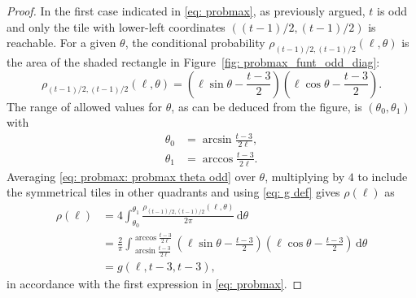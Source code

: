 \documentclass[12pt, a4paper]{article}
\newcommand{\diff}{\,\mathrm d}
\newcommand{\probmax}{\rho} %
\newcommand{\len}{\ell} %
\newcommand{\tiles}{t} %
\begin{document}
\begin{proof}
In the first case indicated in \eqref{eq: probmax}, as previously argued, $\tiles$ is odd and only the tile with lower-left coordinates $((\tiles-1)/2, (\tiles-1)/2)$ is reachable. For a given $\theta$, the conditional probability $\probmax_{(\tiles-1)/2, (\tiles-1)/2}(\len, \theta)$ is the area of the shaded rectangle in Figure~\ref{fig: probmax_funt_odd_diag}:
\begin{equation}
\label{eq: probmax: probmax theta odd}
\probmax_{(\tiles-1)/2, (\tiles-1)/2}(\len, \theta) = \left(\len\sin\theta - \frac{\tiles-3}2\right) \left(\len\cos\theta - \frac{\tiles-3}2\right).
\end{equation}
The range of allowed values for $\theta$, as can be deduced from the figure, is $(\theta_0, \theta_1)$ with
\begin{align}
\label{eq: odd theta 0}
\theta_0 & = \arcsin\frac{\tiles-3}{2\len}, \\
\label{eq: odd theta 1}
\theta_1 & = \arccos\frac{\tiles-3}{2\len}.
\end{align}
Averaging \eqref{eq: probmax: probmax theta odd} over $\theta$, multiplying by $4$ to include the symmetrical tiles in other quadrants and using \eqref{eq: g def} gives $\probmax(\len)$ as
\begin{equation}
\label{eq: probmax: probmax odd}
\begin{split}
\probmax(\len) & = 4 \int_{\theta_0}^{\theta_1} \frac{\probmax_{(\tiles-1)/2, (\tiles-1)/2}(\len, \theta)}{2\pi} \diff \theta \\
& = \frac 2 \pi \int_{\arcsin\frac{\tiles-3}{2\len}}^{\arccos\frac{\tiles-3}{2\len}} \left( \len\sin\theta - \frac{\tiles-3} 2 \right)  \left( \len\cos\theta - \frac{\tiles-3} 2 \right) \diff \theta \\
& = g\left( \len, \tiles-3, \tiles-3 \right ),
\end{split}
\end{equation}
in accordance with the first expression in \eqref{eq: probmax}.


\end{proof}
\end{document}
